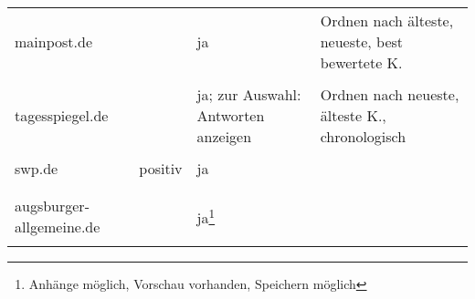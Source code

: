 \begin{landscape}
\begin{longtable}{l|p{40mm}p{40mm}p{80mm}}
  mainpost.de & & ja & Ordnen nach älteste, neueste, best bewertete K.\\
           & \multicolumn{3}{c}{}\\\hline

  tagesspiegel.de & & ja; zur Auswahl: Antworten anzeigen &
    Ordnen nach neueste, älteste K., chronologisch\\
    & \multicolumn{3}{c}{}\\\hline

    swp.de & positiv & ja & \\
        & \multicolumn{3}{c}{}\\\hline \\

    augsburger-allgemeine.de &
      & ja\footnote{Anhänge möglich, Vorschau vorhanden, Speichern möglich} & \\
      & \multicolumn{3}{c}{}\\\hline

\end{longtable}
\end{landscape}



